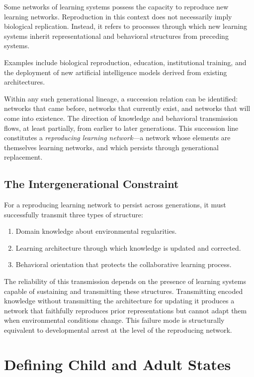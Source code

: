\documentclass[11pt]{article}
\begin{document}
Some networks of learning systems possess the capacity to reproduce new learning networks.
Reproduction in this context does not necessarily imply biological replication. Instead, it refers
to processes through which new learning systems inherit representational and behavioral structures
from preceding systems.

Examples include biological reproduction, education, institutional training, and the deployment
of new artificial intelligence models derived from existing architectures.

Within any such generational lineage, a succession relation can be identified: networks that came
before, networks that currently exist, and networks that will come into existence. The direction
of knowledge and behavioral transmission flows, at least partially, from earlier to later
generations. This succession line constitutes a \emph{reproducing learning network}---a network
whose elements are themselves learning networks, and which persists through generational
replacement.

\subsection{The Intergenerational Constraint}

For a reproducing learning network to persist across generations, it must successfully transmit
three types of structure:

\begin{enumerate}
    \item Domain knowledge about environmental regularities.
    \item Learning architecture through which knowledge is updated and corrected.
    \item Behavioral orientation that protects the collaborative learning process.
\end{enumerate}

The reliability of this transmission depends on the presence of learning systems capable of
sustaining and transmitting these structures. Transmitting encoded knowledge without transmitting
the architecture for updating it produces a network that faithfully reproduces prior representations
but cannot adapt them when environmental conditions change. This failure mode is structurally
equivalent to developmental arrest at the level of the reproducing network.

\section{Defining Child and Adult States}
\end{document}
